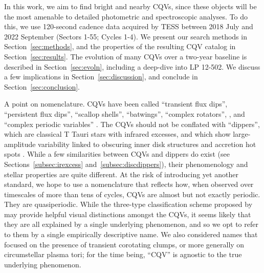 \documentclass[11pt,twocolumn,tighten]{aastex63}
\begin{document}
In this work, we aim to find bright and nearby CQVs, since these
objects will be the most amenable to detailed photometric and
spectroscopic analyses.  To do this, we use 120-second cadence data
acquired by TESS between 2018 July and 2022 September (Sectors 1-55;
Cycles 1-4).  We present our search methods in
Section~\ref{sec:methods}, and the properties of the resulting CQV
catalog in Section~\ref{sec:results}.  The evolution of many CQVs over
a two-year baseline is described in Section~\ref{sec:evoln}, including
a deep-dive into LP 12-502.  We discuss a few implications in
Section~\ref{sec:discussion}, and conclude in
Section~\ref{sec:conclusion}.

A point on nomenclature.  CQVs have been called ``transient flux
dips'', ``persistent flux dips'', ``scallop shells'', ``batwings'',
\citep{2017AJ....153..152S} ``complex rotators'',
\citep{2019ApJ...876..127Z,2022AJ....163..144G,2023ApJ...945..114P},
and ``complex periodic variables'' \citep{2023MNRAS.518.2921K}.  The
CQVs should not be conflated with ``dippers'', which are classical T
Tauri stars with infrared excesses, and which show large-amplitude
variability linked to obscuring inner disk structures and accretion
hot spots \citep{2014AJ....147...82C,2021ApJ...908...16R}.  While a
few similarities between CQVs and dippers do exist (see
Sections~\ref{subsec:irexcess} and~\ref{subsec:discdippers}), their
phenomenology and stellar properties are quite different.  At the risk
of introducing yet another standard, we hope to use a nomenclature
that reflects how, when observed over timescales of more than tens of
cycles, CQVs are almost but not exactly periodic.  They are
quasiperiodic.  While the three-type classification scheme proposed by
\citet{2017AJ....153..152S} may provide helpful visual
distinctions amongst the CQVs, it seems likely that they are all
explained by a single underlying phenomenon, and so we opt to refer to
them by a single empirically descriptive name.  We also considered
names that focused on the presence of transient corotating clumps, or
more generally on circumstellar plasma tori; for the time being,
``CQV'' is agnostic to the true underlying phenomenon.
\end{document}
